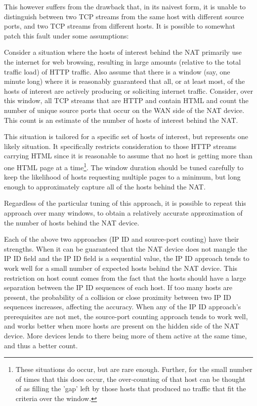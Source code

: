 \documentclass{article}
\theoremstyle{remark}
\theoremstyle{definition}
\theoremstyle{definition}
\theoremstyle{definition}
\begin{document}
This however suffers from the drawback that, in its naivest form, it is unable to distinguish between two TCP streams from the same host with different source ports, and two TCP streams from different hosts. It is possible to somewhat patch this fault under some assumptions:

Consider a situation where the hosts of interest behind the NAT primarily use the internet for web browsing, resulting in large amounts (relative to the total traffic load) of HTTP traffic. Also assume that there is a window (say, one minute long) where it is reasonably guaranteed that all, or at least most, of the hosts of interest are actively producing or soliciting internet traffic. Consider, over this window, all TCP streams that are HTTP and contain HTML and count the number of unique source ports that occur on the WAN side of the NAT device. This count is an estimate of the number of hosts of interest behind the NAT.

This situation is tailored for a specific set of hosts of interest, but represents one likely situation. It specifically restricts consideration to those HTTP streams carrying HTML since it is reasonable to assume that no host is getting more than one HTML page at a time\footnote{These situations do occur, but are rare enough. Further, for the small number of times that this does occur, the over-counting of that host can be thought of as filling the 'gap' left by those hosts that produced no traffic that fit the criteria over the window.}. The window duration should be tuned carefully to keep the likelihood of hosts requesting multiple pages to a minimum, but long enough to approximately capture all of the hosts behind the NAT.

Regardless of the particular tuning of this approach, it is possible to repeat this approach over many windows, to obtain a relatively accurate approximation of the number of hosts behind the NAT device.

Each of the above two approaches (IP ID and source-port couting) have their strengths. When it can be guaranteed that the NAT device does not mangle the IP ID field and the IP ID field is a sequential value, the IP ID approach tends to work well for a small number of expected hosts behind the NAT device. This restriction on host count comes from the fact that the hosts should have a large separation between the IP ID sequences of each host. If too many hosts are present, the probability of a collision or close proximity between two IP ID sequences increases, affecting the accuracy. When any of the IP ID approach's prerequisites are not met, the source-port counting approach tends to work well, and works better when more hosts are present on the hidden side of the NAT device. More devices lends to there being more of them active at the same time, and thus a better count.
\end{document}
